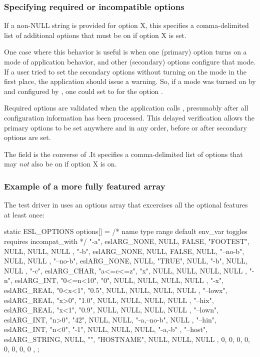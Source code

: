   \subsubsection{Specifying required or incompatible options}

If a non-NULL string  is provided for option X,
this specifies a comma-delimited list of additional options that must
be on if option X is set. 

One case where this behavior is useful is when one (primary) option
turns on a mode of application behavior, and other (secondary) options
configure that mode. If a user tried to set the secondary options
without turning on the mode in the first place, the application should
issue a warning. So, if a mode was turned on by  and
configured by , one could set
 to  for the option
.

Required options are validated when the application calls
, presumably after all configuration
information has been processed. This delayed verification allows the
primary options to be set anywhere and in any order, before or after
secondary options are set.

The  field is the converse of
.It specifies a comma-delimited list of options
that may \emph{not} also be on if option X is on.

   \subsubsection{Example of a more fully featured  array}

The test driver in  uses an options array that
excercises all the optional features at least once:

\begin{cchunk}
static ESL_OPTIONS options[] = {
  /* name          type         range   default   env_var  toggles  requires incompat_with */
  { "-a",     eslARG_NONE,       NULL,   FALSE, "FOOTEST",   NULL,    NULL,        NULL },
  { "-b",     eslARG_NONE,       NULL,   FALSE,     NULL, "--no-b",   NULL,        NULL },
  { "--no-b", eslARG_NONE,       NULL,  "TRUE",     NULL,     "-b",   NULL,        NULL },
  { "-c",     eslARG_CHAR,  "a<=c<=z",    "x",      NULL,    NULL,    NULL,        NULL },
  { "-n",     eslARG_INT,   "0<=n<10",    "0",      NULL,    NULL,    NULL,        NULL },
  { "-x",     eslARG_REAL,    "0<x<1",  "0.5",      NULL,    NULL,    NULL,        NULL },
  { "--lowx", eslARG_REAL,      "x>0",  "1.0",      NULL,    NULL,    NULL,        NULL },
  { "--hix",  eslARG_REAL,      "x<1",  "0.9",      NULL,    NULL,    NULL,        NULL },
  { "--lown", eslARG_INT,       "n>0",   "42",      NULL,    NULL, "-a,--no-b",    NULL },
  { "--hin",  eslARG_INT,       "n<0",   "-1",      NULL,    NULL,    NULL,     "-a,-b" },
  { "--host", eslARG_STRING,     NULL,      "", "HOSTNAME",  NULL,    NULL,        NULL },
  {  0, 0, 0, 0, 0, 0, 0, 0 },
};
\end{cchunk}

